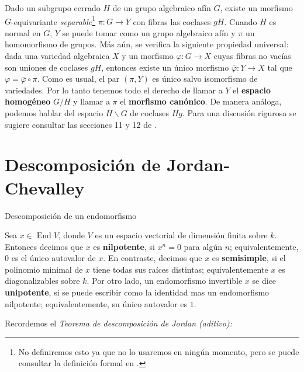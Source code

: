 \documentclass[spanish,10pt]{amsart}
\makeatletter
\renewcommand\subsection{\@startsection{subsection}{2}%
  \z@{.5\linespacing\@plus.7\linespacing}{-.5em}%
  {\normalfont\sffamily}}
\theoremstyle{definition}
\theoremstyle{remark}
\numberwithin{equation}{section}
\renewcommand{\bar}[1]{\overline{#1}}
\makeatother
\begin{document}
Dado un subgrupo cerrado $H$ de un grupo algebraico afín $G$, existe un morfismo $G$-equivariante \textit{separable}\footnote{No definiremos esto ya que no lo usaremos en ningún momento, pero se puede consultar la definición formal en \cite{humphreys2012linearAlgebraicGroups}.} $\pi : G \to Y$ con fibras las coclases $g H$. Cuando $H$ es normal en $G$, $Y$ se puede tomar como un grupo algebraico afín y $\pi$ un homomorfismo de grupos. Más aún, se verifica la siguiente propiedad universal: dada una variedad algebraica $X$ y un morfismo $\varphi : G \to X$ cuyas fibras no vacías son uniones de coclases $gH$, entonces existe un único morfismo $\bar \varphi : Y \to X$ tal que $\varphi = \bar \varphi \circ \pi$. Como es usual, el par $(\pi, Y)$ es único salvo isomorfismo de variedades. Por lo tanto tenemos todo el derecho de llamar a $Y$ el \textbf{espacio homogéneo} $G/H$ y llamar a $\pi$ el \textbf{morfismo canónico}. De manera análoga, podemos hablar del espacio $H\backslash G$ de coclases $Hg$. Para una discusión rigurosa se sugiere consultar las secciones 11 y 12 de \cite{humphreys2012linearAlgebraicGroups}.





\section{Descomposición de Jordan-Chevalley}

\subsection{Descomposición de un endomorfismo}

Sea $x \in \operatorname{End} V$, donde $V$ es un espacio vectorial de dimensión finita sobre $k$. Entonces decimos que $x$ es \textbf{nilpotente}, si $x^n = 0$ para algún $n$; equivalentemente, $0$ es el único autovalor de $x$. En contraste, decimos que $x$ es \textbf{semisimple}, si el polinomio minimal de $x$ tiene todas sus raíces distintas; equivalentemente $x$ es diagonalizables sobre $k$. Por otro lado, un endomorfismo invertible $x$ se dice \textbf{unipotente}, si se puede escribir como la identidad mas un endomorfismo nilpotente; equivalentemente, su único autovalor es $1$.

Recordemos el \textit{Teorema de descomposición de Jordan (aditivo):}
\end{document}
